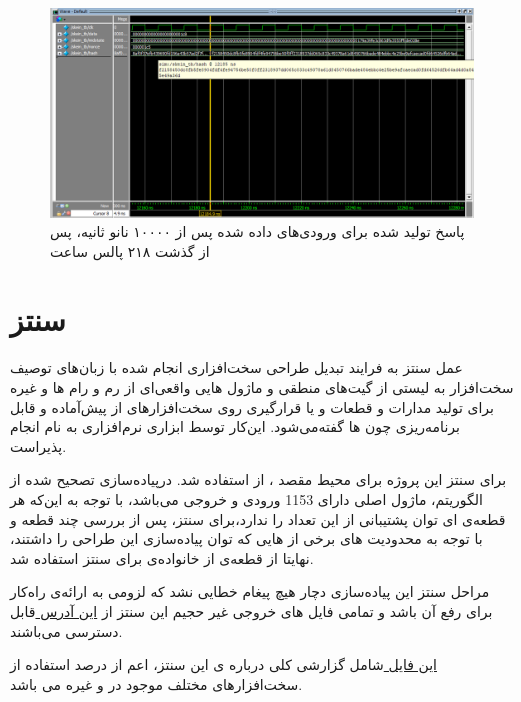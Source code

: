 \begin{figure}[H]
	\centering
	\includegraphics[width=16cm]{../RunData/sim_part3.png}	
	\caption{
		پاسخ تولید شده برای ورودی‌های داده شده پس از ۱۰۰۰۰ نانو ثانیه، پس از گذشت ۲۱۸ پالس ساعت
	}
\end{figure}

\pagebreak

\section{سنتز}
عمل سنتز به فرایند تبدیل طراحی سخت‌افزاری انجام شده با زبان‌های توصیف سخت‌افزار به لیستی از گیت‌های منطقی و ماژول هایی واقعی‌ای از رم‌ و رام ها و غیره برای تولید مدارات و قطعات   و یا قرارگیری روی سخت‌افزار‌های از پیش‌آماده و قابل برنامه‌ریزی چون ‌ها گفته‌می‌شود. این‌کار توسط ابزاری نرم‌افزاری به نام 
انجام پذیر‌است.

برای سنتز این پروژه برای محیط مقصد
، از
استفاده شد. درپیاده‌سازی تصحیح شده از الگوریتم، ماژول اصلی دارای 1153 
 ورودی و خروجی می‌باشد، با توجه به این‌که هر قطعه‌ی  ای توان پشتیبانی از این تعداد
 را ندارد،برای سنتز، پس از بررسی چند قطعه و با توجه به محدودیت های 
برخی از 
هایی که توان پیاده‌سازی این طراحی را داشتند، نهایتا از قطعه‌ی  از خانواده‌ی 
برای سنتز استفاده شد.

مراحل سنتز این پیاده‌سازی دچار هیچ پیغام خطایی نشد که لزومی به ارائه‌ی راه‌کار برای رفع آن باشد و تمامی فایل های خروجی غیر حجیم این سنتز از
\href{https://github.com/VahidZee/SkeinHashingHDL/blob/master/SynthesisFiles/}{
	 این آدرس
} 
قابل دسترسی می‌باشند.


\href{https://github.com/VahidZee/SkeinHashingHDL/blob/master/SynthesisFiles/report_summery.html}{
	این فایل
} 
شامل گزارشی کلی درباره ی این سنتز، اعم از درصد استفاده از سخت‌افزار‌های مختلف موجود در 
و غیره می باشد.

